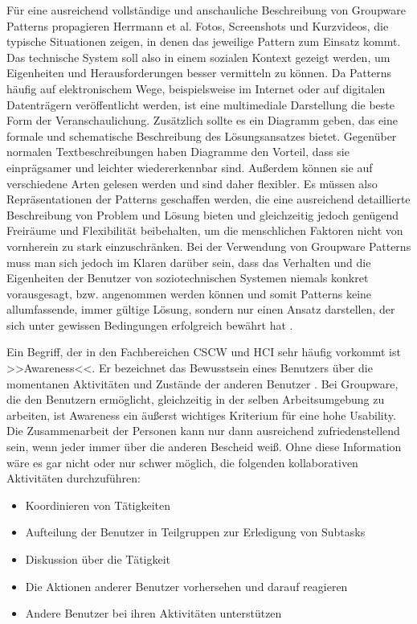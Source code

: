\medskip Für eine ausreichend vollständige und anschauliche Beschreibung von Groupware Patterns propagieren Herrmann et al. Fotos, Screenshots und Kurzvideos, die typische Situationen zeigen, in denen das jeweilige Pattern zum Einsatz kommt. Das technische System soll also in einem sozialen Kontext gezeigt werden, um Eigenheiten und Herausforderungen besser vermitteln zu können. Da Patterns häufig auf elektronischem Wege, beispielsweise im Internet oder auf digitalen Datenträgern veröffentlicht werden, ist eine multimediale Darstellung die beste Form der Veranschaulichung. Zusätzlich sollte es ein Diagramm geben, das eine formale und schematische Beschreibung des Lösungsansatzes bietet. Gegenüber normalen Textbeschreibungen haben Diagramme den Vorteil, dass sie einprägsamer und leichter wiedererkennbar sind. Außerdem können sie auf verschiedene Arten gelesen werden und sind daher flexibler. Es müssen also Repräsentationen der Patterns geschaffen werden, die eine ausreichend detaillierte Beschreibung von Problem und Lösung bieten und gleichzeitig jedoch genügend Freiräume und Flexibilität beibehalten, um die menschlichen Faktoren nicht von vornherein zu stark einzuschränken. Bei der Verwendung von Groupware Patterns muss man sich jedoch im Klaren darüber sein, dass das Verhalten und die Eigenheiten der Benutzer von soziotechnischen Systemen niemals konkret vorausgesagt, bzw. angenommen werden können und somit Patterns keine allumfassende, immer gültige Lösung, sondern nur einen Ansatz darstellen, der sich unter gewissen Bedingungen erfolgreich bewährt hat \citep{Herrmann:2003}.

\bigskip Ein Begriff, der in den Fachbereichen \ac{CSCW} und \ac{HCI} sehr häufig vorkommt ist >>Awareness<<. Er bezeichnet das Bewusstsein eines Benutzers über die momentanen Aktivitäten und Zustände der anderen Benutzer \citep{Dourish:1992, Hornecker:2008}. Bei Groupware, die den Benutzern ermöglicht, gleichzeitig in der selben Arbeitsumgebung zu arbeiten, ist Awareness ein äußerst wichtiges Kriterium für eine hohe Usability. Die Zusammenarbeit der Personen kann nur dann ausreichend zufriedenstellend sein, wenn jeder immer über die anderen Bescheid weiß. Ohne diese Information wäre es gar nicht oder nur schwer möglich, die folgenden kollaborativen Aktivitäten durchzuführen:

\begin{itemize}
	\item{Koordinieren von Tätigkeiten}
	\item{Aufteilung der Benutzer in Teilgruppen zur Erledigung von Subtasks}
	\item{Diskussion über die Tätigkeit}
	\item{Die Aktionen anderer Benutzer vorhersehen und darauf reagieren}
	\item{Andere Benutzer bei ihren Aktivitäten unterstützen}
\end{itemize}
\begin{flushright}
	\citep{Gutwin:1999}
\end{flushright} 

